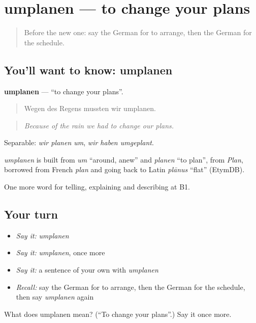 \section[umplanen]{umplanen — to change your plans}

\label{lesson:GE-C372-umplanen}



\begin{quote}
Before the new one: say the German for to arrange, then the German for the schedule.
\end{quote}

\subsection*{You'll want to know: umplanen}
\textbf{umplanen} — \textquotedblleft{}to change your plans\textquotedblright{}.

\begin{quote}
Wegen des Regens mussten wir umplanen.
\end{quote}

\begin{quote}
\emph{Because of the rain we had to change our plans.}
\end{quote}

Separable: \emph{wir planen um}, \emph{wir haben umgeplant}.

\begin{cousinweb}
\emph{umplanen} is built from \emph{um} \textquotedblleft{}around, anew\textquotedblright{} and \emph{planen} \textquotedblleft{}to plan\textquotedblright{}, from \emph{Plan}, borrowed from French \emph{plan} and going back to Latin \emph{plānus} \textquotedblleft{}flat\textquotedblright{} (EtymDB).
\end{cousinweb}

\begin{grammarlens}[title={What you've built}]
One more word for telling, explaining and describing at B1.
\end{grammarlens}

\subsection*{Your turn}
\begin{itemize}
\raggedright
  \item \emph{Say it:} \emph{umplanen}
  \item \emph{Say it:} \emph{umplanen}, once more
  \item \emph{Say it:} a sentence of your own with \emph{umplanen}
  \item \emph{Recall:} say the German for to arrange, then the German for the schedule, then say \emph{umplanen} again
\end{itemize}

\begin{tcolorbox}[breakable,colback=teal!4,colframe=teal!35!black,title={Before you move on}]
What does umplanen mean? (\textquotedblleft{}To change your plans\textquotedblright{}.) Say it once more.
\end{tcolorbox}
